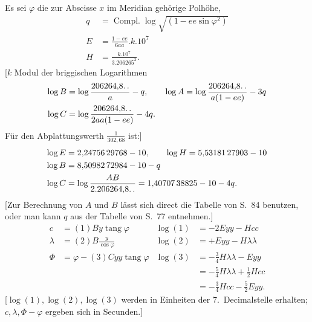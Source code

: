 Es sei \(\varphi\) die zur Abscisse \(x\) im Meridian gehörige Polhöhe,
\[
\begin{aligned}
q&=\operatorname{Compl.}\log\sqrt{(1-ee\sin\varphi^2)}\\
E&=\frac{1-ee}{6aa}.k.10^7\\
H&=\frac{k.10^7}{3.206265^2}.
\end{aligned}
\]
[\(k\) Modul der briggischen Logarithmen
\[
\begin{aligned}
\log B&=\log\frac{206264{,}8\ldotp\ldotp}a-q,\qquad\log A=\log\frac{206264{,}8\ldotp\ldotp}{a(1-ee)}-3q\\
\log C&=\log\frac{206264{,}8\ldotp\ldotp}{2aa(1-ee)}-4q.
\end{aligned}
\]
Für den Abplattungswerth \(\frac1{302{,}68}\) ist:]
\[
\begin{aligned}
\log E&=2{,}24756\,29768-10,\qquad\log H=5{,}53181\,27903-10\\
\log B&=8{,}50982\,72984-10-q\\
\log C&=\log\frac{AB}{2.206264{,}8\ldotp\ldotp}=1{,}40707\,38825-10-4q.
\end{aligned}
\]
[Zur Berechnung von \(A\) und \(B\) lässt sich direct die Tabelle von S.~84 benutzen, oder man kann \(q\) aus der Tabelle von S.~77 entnehmen.]
\[
\begin{aligned}
c&=(1)By\operatorname{tang}\varphi&\log(1)&=-2Eyy-Hcc\\
\lambda&=(2)B\frac y{\cos\varphi}&\log(2)&=+Eyy-H\lambda\lambda\\
\Phi&=\varphi-(3)Cyy\operatorname{tang}\varphi&\log(3)&=-\tfrac34H\lambda\lambda-Eyy\\
&&&=-\tfrac54H\lambda\lambda+\tfrac12Hcc\\
&&&=-\tfrac34Hcc-\tfrac52Eyy.
\end{aligned}
\]
[\(\log(1),\log(2),\log(3)\) werden in Einheiten der 7.~Decimalstelle erhalten; \(c,\lambda,\Phi-\varphi\) ergeben sich in Secunden.]
